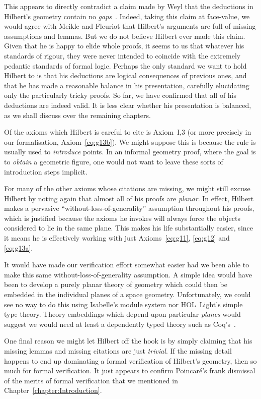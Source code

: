 This appears to directly contradict a claim made by Weyl that the deductions in Hilbert's geometry contain no \emph{gaps}~\cite{TableChairMug}. Indeed, taking this claim at face-value, we would agree with Meikle and Fleuriot that Hilbert's arguments are full of missing assumptions and lemmas. But we do not believe Hilbert ever made this claim. Given that he is happy to elide whole proofs, it seems to us that whatever his standards of rigour, they were never intended to coincide with the extremely pedantic standards of formal logic. Perhaps the only standard we want to hold Hilbert to is that his deductions are logical consequences of previous ones, and that he has made a reasonable balance in his presentation, carefully elucidating only the particularly tricky proofs. So far, we have confirmed that all of his deductions are indeed valid. It is less clear whether his presentation is balanced, as we shall discuss over the remaining chapters.

Of the axioms which Hilbert is careful to cite is Axiom~I,3 (or more precisely in our formalisation, Axiom~\ref{eq:g13b}). We might suppose this is because the rule is usually used to \emph{introduce} points. In an informal geometry proof, where the goal is to \emph{obtain} a geometric figure, one would not want to leave these sorts of introduction steps implicit. 

For many of the other axioms whose citations are missing, we might still excuse Hilbert by noting again that almost all of his proofs are \emph{planar}. In effect, Hilbert makes a pervasive ``without-loss-of-generality'' assumption throughout his proofs, which is justified because the axioms he invokes will always force the objects considered to lie in the same plane. This makes his life substantially easier, since it means he is effectively working with just Axioms~\ref{eq:g11}, \ref{eq:g12} and \ref{eq:g13a}. 

It would have made our verification effort somewhat easier had we been able to make this same without-loss-of-generality assumption. A simple idea would have been to develop a purely planar theory of geometry which could then be embedded in the individual planes of a space geometry. Unfortunately, we could see no way to do this using Isabelle's module system nor HOL~Light's simple type theory. Theory embeddings which depend upon particular \emph{planes} would suggest we would need at least a dependently typed theory such as Coq's~\cite{Coq}.

One final reason we might let Hilbert off the hook is by simply claiming that his missing lemmas and missing citations are just \emph{trivial}. If the missing detail happens to end up dominating a formal verification of Hilbert's geometry, then so much for formal verification. It just appears to confirm Poincar\'{e}'s frank dismissal of the merits of formal verification that we mentioned in Chapter~\ref{chapter:Introduction}. 

